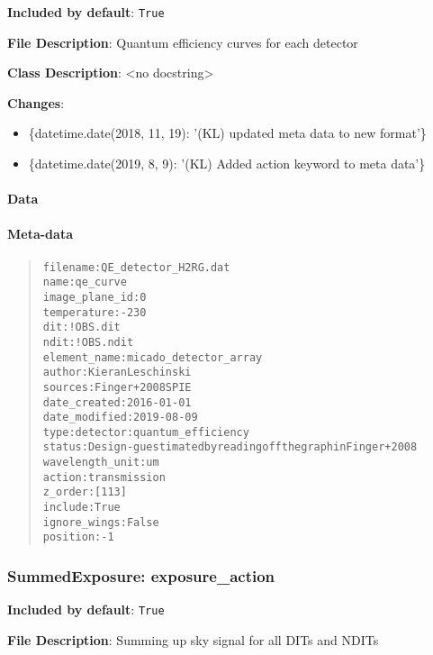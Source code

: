 \documentclass[a4paper]{article}
\begin{document}
\textbf{Included by default}: \texttt{True}

\textbf{File Description}: Quantum efficiency curves for each detector

\textbf{Class Description}: <no docstring>

\textbf{Changes}:

\begin{itemize}
\item \{datetime.date(2018, 11, 19): '(KL) updated meta data to new format'\}

\item \{datetime.date(2019, 8, 9): '(KL) Added action keyword to meta data'\}
\end{itemize}


\paragraph{Data%
  \label{id27}%
}


\paragraph{Meta-data%
  \label{id28}%
}

\begin{quote}
\begin{alltt}
       filename : QE_detector_H2RG.dat
           name : qe_curve
 image_plane_id : 0
    temperature : -230
            dit : !OBS.dit
           ndit : !OBS.ndit
   element_name : micado_detector_array
         author : Kieran Leschinski
        sources : Finger+ 2008 SPIE
   date_created : 2016-01-01
  date_modified : 2019-08-09
           type : detector:quantum_efficiency
         status : Design - guestimated by reading off the graph in Finger+ 2008
wavelength_unit : um
         action : transmission
        z_order : [113]
        include : True
   ignore_wings : False
       position : -1
\end{alltt}
\end{quote}


\subsubsection{SummedExposure: \textquotedbl{}exposure\_action\textquotedbl{}%
  \label{summedexposure-exposure-action}%
}

\textbf{Included by default}: \texttt{True}

\textbf{File Description}: Summing up sky signal for all DITs and NDITs
\end{document}
